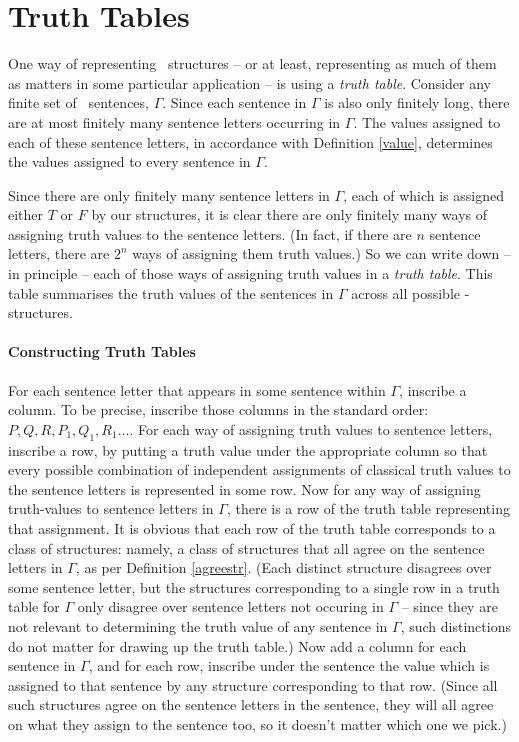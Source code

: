 \section{Truth Tables}

One way of representing \lone\ structures – or at least, representing as much of them as matters in some particular application – is using a \emph{truth table}. Consider any finite set of \lone\ sentences,  $\Gamma$. Since each sentence in $\Gamma$ is also only finitely long, there are at most finitely many sentence letters occurring in $\Gamma$. The values assigned to each of these sentence letters, in accordance with Definition \ref{value}, determines the values assigned to every sentence in $\Gamma$.

Since there are only finitely many sentence letters in $\Gamma$, each of which is assigned either $T$ or $F$ by our structures, it is clear there are only finitely many ways of assigning truth values to the sentence letters. (In fact, if there are $n$ sentence letters, there are $2^n$ ways of assigning them truth values.) So we can write down – in principle – each of those ways of assigning truth values in a \emph{truth table}. This table summarises the truth values of the sentences in $\Gamma$ across all possible \lone-structures.

\paragraph{Constructing Truth Tables} For each sentence letter that appears in some sentence within $\Gamma$, inscribe a column. To be precise, inscribe those columns in the standard order: $P,Q,R,P_{1},Q_{1},R_{1}…$. For each way of assigning truth values to sentence letters, inscribe a row, by putting a truth value under the appropriate column so that every possible combination of independent assignments of classical truth values to the sentence letters is represented in some row. Now for any way of assigning truth-values to sentence letters in $\Gamma$, there is a row of the truth table representing that assignment. It is obvious that each row of the truth table corresponds to a class of structures: namely, a class of structures that all agree on the sentence letters in $\Gamma$, as per Definition \ref{agreestr}. (Each distinct structure disagrees over some sentence letter, but the structures corresponding to a single row in a truth table for $\Gamma$ only disagree over sentence letters not occuring in $\Gamma$ –  since they are not relevant to determining the truth value of any sentence in $\Gamma$, such distinctions do not matter for drawing up the truth table.) Now add a column for each sentence in $\Gamma$, and for each row, inscribe under the sentence the value which is assigned to that sentence by any structure corresponding to that row. (Since all such structures agree on the sentence letters in the sentence, they will all agree on what they assign to the sentence too, so it doesn't matter which one we pick.) 

